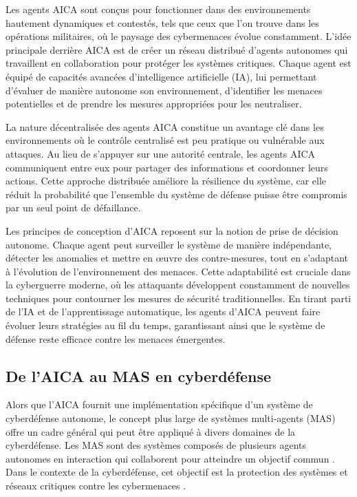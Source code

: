 Les agents AICA sont conçus pour fonctionner dans des environnements hautement dynamiques et contestés, tels que ceux que l'on trouve dans les opérations militaires, où le paysage des cybermenaces évolue constamment. L'idée principale derrière AICA est de créer un réseau distribué d'agents autonomes qui travaillent en collaboration pour protéger les systèmes critiques. Chaque agent est équipé de capacités avancées d'intelligence artificielle (IA), lui permettant d'évaluer de manière autonome son environnement, d'identifier les menaces potentielles et de prendre les mesures appropriées pour les neutraliser.

La nature décentralisée des agents AICA constitue un avantage clé dans les environnements où le contrôle centralisé est peu pratique ou vulnérable aux attaques. Au lieu de s'appuyer sur une autorité centrale, les agents AICA communiquent entre eux pour partager des informations et coordonner leurs actions. Cette approche distribuée améliore la résilience du système, car elle réduit la probabilité que l'ensemble du système de défense puisse être compromis par un seul point de défaillance.

Les principes de conception d'AICA reposent sur la notion de prise de décision autonome. Chaque agent peut surveiller le système de manière indépendante, détecter les anomalies et mettre en œuvre des contre-mesures, tout en s'adaptant à l'évolution de l'environnement des menaces. Cette adaptabilité est cruciale dans la cyberguerre moderne, où les attaquants développent constamment de nouvelles techniques pour contourner les mesures de sécurité traditionnelles. En tirant parti de l'IA et de l'apprentissage automatique, les agents d'AICA peuvent faire évoluer leurs stratégies au fil du temps, garantissant ainsi que le système de défense reste efficace contre les menaces émergentes.

\subsection{De l'AICA au MAS en cyberdéfense}

Alors que l'AICA fournit une implémentation spécifique d'un système de cyberdéfense autonome, le concept plus large de systèmes multi-agents (MAS) offre un cadre général qui peut être appliqué à divers domaines de la cyberdéfense. Les MAS sont des systèmes composés de plusieurs agents autonomes en interaction qui collaborent pour atteindre un objectif commun \cite{kott2018towards}. Dans le contexte de la cyberdéfense, cet objectif est la protection des systèmes et réseaux critiques contre les cybermenaces \cite{jajodia2017autonomous}.

